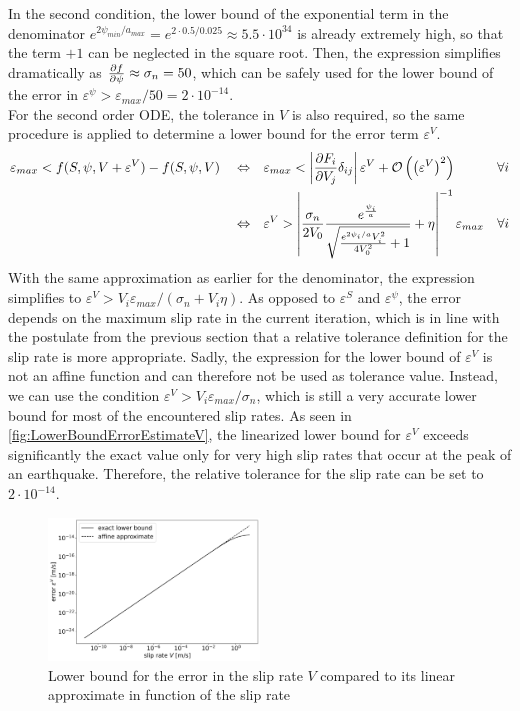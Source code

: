 In the second condition, the lower bound of the exponential term in the denominator $e^{2\psi_{min}/a_{max}} = e^{2 \cdot 0.5 / 0.025} \approx 5.5\cdot10^{34}$ is already extremely high, so that the term $+1$ can be neglected in the square root. Then, the expression simplifies dramatically as $\pdv{f}{\psi} \approx \sigma_n = 50$, which can be safely used for the lower bound of the error in $\varepsilon^\psi > \varepsilon_{max}/50 = 2\cdot10^{-14}$. \\
For the second order ODE, the tolerance in $V$ is also required, so the same procedure is applied to determine a lower bound for the error term $\varepsilon^V$.
\begin{align}
	&\varepsilon_{max} < f(S,\psi,V+\varepsilon^{V}) - f(S,\psi,V)
	&&\Leftrightarrow&&
	\varepsilon_{max} < \left|\pdv{F_i}{V_j}\delta_{ij}\right|\varepsilon^V + \mathcal{O}\left(\left(\varepsilon^V\right)^2\right) & \forall i \nonumber \\
	&&&\Leftrightarrow &&
	\varepsilon^V > \left|\frac{\sigma_n}{2V_0}\frac{ e^{\frac{\psi_i}{a}}}{\sqrt{\frac{e^{2\psi_i/a}V_i^2}{4V_0^2} + 1}} + \eta\right|^{-1}\varepsilon_{max} & \forall i
\end{align}
With the same approximation as earlier for the denominator, the expression simplifies to $\varepsilon^V > V_i\varepsilon_{max}/(\sigma_n + V_i\eta)$. As opposed to $\varepsilon^S$ and $\varepsilon^\psi$, the error depends on the maximum slip rate in the current iteration, which is in line with the postulate from the previous section that a relative tolerance definition for the slip rate is more appropriate. Sadly, the expression for the lower bound of $\varepsilon^V$ is not an affine function and can therefore not be used as tolerance value. Instead, we can use the condition $\varepsilon^V > V_i\varepsilon_{max}/\sigma_n$, which is still a very accurate lower bound for most of the encountered slip rates. As seen in \autoref{fig:LowerBoundErrorEstimateV}, the linearized lower bound for $\varepsilon^V$ exceeds significantly the exact value only for very high slip rates that occur at the peak of an earthquake. Therefore, the relative tolerance for the slip rate can be set to $2\cdot10^{-14}$.

\begin{figure}[H]
	\centering
	\includegraphics[width=0.5\textwidth]{images/ErrorRelationPSI_VAbsoluteRelative.png}
	\caption{Lower bound for the error in the slip rate $V$ compared to its linear approximate in function of the slip rate}
	\label{fig:LowerBoundErrorEstimateV}
\end{figure}

